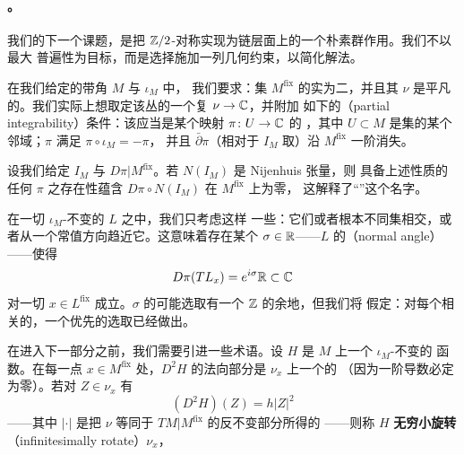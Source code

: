\paragraph{\trEquivariant{}\trTransversality。}\label{sub:equivariant-transversality}
我们的下一个课题，是把 $\mathbb{Z}/2$-对称实现为链层面上的一个朴素群作用。我们不以最大
普遍性为目标，而是选择施加一列几何约束，以简化解法。
\begin{assumption}\label{thm:fixed-point-set-assumption}
在我们给定的带角\trExactSymplectic\trManifold{} $M$ 与\trInvolution{} $\iota_M$ 中，
我们要求：\trFixedPoint{}集 $M^{\mathrm{fix}}$ 的实\trCodimension{}为二，并且其\trNormalBundle{}
$\nu$ 是平凡的。我们实际上想取定该丛的一个复\trTrivialization{} $\nu\to\mathbb{C}$，并附加
如下的\textbf{\trPartialIntegrability}（partial integrability）条件：该\trTrivialization{}应当是某个映射 $\pi\colon U\to\mathbb{C}$ 的%
\trDifferential，其中 $U\subset M$ 是\trFixedPoint{}集的某个邻域；$\pi$ 满足 $\pi\circ\iota_M=-\pi$，
并且 $\bar{\partial}\pi$（相对于 $I_M$ 取）沿 $M^{\mathrm{fix}}$ 一阶消失。
\end{assumption}
设我们给定 $I_M$ 与\trTrivialization{} $D\pi|M^{\mathrm{fix}}$。若 $N(I_M)$ 是 Nijenhuis 张量，则
具备上述性质的任何 $\pi$ 之存在性蕴含 $D\pi\circ N(I_M)$ 在 $M^{\mathrm{fix}}$ 上为零，
这解释了“\trPartialIntegrability”这个名字。
\begin{assumption}\label{thm:normal-angle-assumption}
在一切 $\iota_M$-不变的\trExact\trLagrange\trSubmanifold{} $L$ 之中，我们只考虑这样
一些：它们或者根本不同\trFixedPoint{}集相交，或者从一个常值方向趋近它。这意味着存在某个
$\sigma\in\mathbb{R}$——$L$ 的\textbf{\trNormalAngle}（normal angle）——使得
\begin{equation*}
D\pi(TL_x)=e^{i\sigma}\mathbb{R}\subset\mathbb{C}
\end{equation*}
对一切 $x\in L^{\mathrm{fix}}$ 成立。$\sigma$ 的可能选取有一个 $\mathbb{Z}$ 的余地，但我们将
假定：对每个相关的\trLagrange\trSubmanifold，一个优先的选取已经做出。
\end{assumption}
在进入下一部分之前，我们需要引进一些术语。设 $H$ 是 $M$ 上一个 $\iota_M$-不变的
函数。在每一点 $x\in M^{\mathrm{fix}}$ 处，$D^2H$ 的法向部分是 $\nu_x$ 上一个\trWellDefined{}的%
\trQuadraticForm（因为一阶导数必定为零）。若对 $Z\in\nu_x$ 有
\begin{equation}\label{eq:normal-hessian-rotation}
(D^2H)(Z)=h|Z|^2
\end{equation}
——其中 $|\cdot|$ 是把 $\nu$ 等同于 $TM|M^{\mathrm{fix}}$ 的反不变部分所得的%
\trHermitian{}\trMetric{}——则称 $H$ \textbf{无穷小旋转}（infinitesimally rotate）$\nu_x$，
